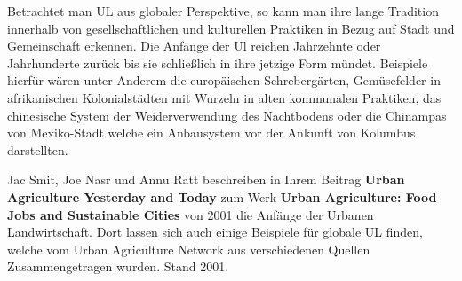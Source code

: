 \documentclass{scrartcl}
\begin{document}
Betrachtet man UL aus globaler Perspektive, so kann man ihre lange Tradition innerhalb von gesellschaftlichen und kulturellen Praktiken in Bezug auf Stadt und Gemeinschaft erkennen. Die Anfänge der Ul reichen Jahrzehnte oder Jahrhunderte zurück bis sie schließlich in ihre jetzige Form mündet. Beispiele hierfür wären unter Anderem die europäischen Schrebergärten, Gemüsefelder in afrikanischen Kolonialstädten mit Wurzeln in alten kommunalen Praktiken, das chinesische System der Weiderverwendung des Nachtbodens oder die Chinampas von Mexiko-Stadt welche ein Anbausystem vor der Ankunft von Kolumbus darstellten.

Jac Smit, Joe Nasr und Annu Ratt beschreiben in Ihrem Beitrag \textbf{Urban Agriculture Yesterday and Today} zum Werk \textbf{Urban Agriculture: Food Jobs and Sustainable Cities} von 2001 die Anfänge der Urbanen Landwirtschaft. Dort lassen sich auch einige Beispiele für globale UL finden, welche vom Urban Agriculture Network aus verschiedenen Quellen Zusammengetragen wurden. Stand 2001.
\end{document}
